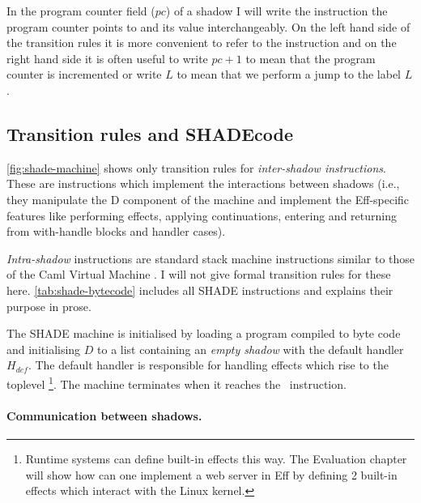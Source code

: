 \documentclass[class=article, crop=false]{standalone}
\begin{document}
In the program counter field ($pc$) of a shadow I will write the instruction
the program counter points to and its value interchangeably. On the left hand
side of the transition rules it is more convenient to refer to the instruction
and on the right hand side it is often useful to write $pc+1$ to mean that the
program counter is incremented or write $L$ to mean that we perform a jump to
the label $L$.

\subsection{Transition rules and SHADEcode}

\autoref{fig:shade-machine} shows only transition rules for \emph{inter-shadow
instructions}. These are instructions which implement the interactions between
shadows (i.e., they manipulate the D component of the machine and implement the
Eff-specific features like performing effects, applying continuations, entering
and returning from with-handle blocks and handler cases).

\emph{Intra-shadow} instructions are standard stack machine instructions similar
to those of the Caml Virtual Machine \cite{caml-vm}. I will not give formal
transition rules for these here. \autoref{tab:shade-bytecode} includes all
SHADE instructions and explains their purpose in prose.

The SHADE machine is initialised by loading a program compiled to byte code
and initialising $D$ to a list containing an \emph{empty shadow} with the
default handler $H_{def}$. The default handler is responsible for handling
effects which rise to the toplevel
\footnote{Runtime systems can define built-in effects this way. The Evaluation
chapter will show how can one implement a web server in Eff by defining 2
built-in effects which interact with the Linux kernel.}.
The machine terminates when it reaches the \vmHalt\ instruction.

\paragraph{Communication between shadows.}
\end{document}
